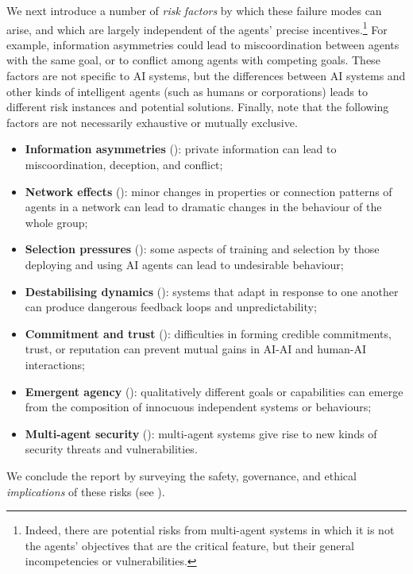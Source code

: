 We next introduce a number of \emph{risk factors} by which these failure modes can arise, and which are largely independent of the agents' precise incentives.\footnote{Indeed, there are potential risks from multi-agent systems in which it is not the agents' objectives that are the critical feature, but their general incompetencies or vulnerabilities.}
For example, information asymmetries could lead to miscoordination between agents with the same goal, or to conflict among agents with competing goals.
These factors are not specific to AI systems, but the differences between AI systems and other kinds of intelligent agents (such as humans or corporations) leads to different risk instances and potential solutions.
Finally, note that the following factors are not necessarily exhaustive or mutually exclusive.
\begin{itemize}
    \item \textbf{Information asymmetries} (): private information can lead to miscoordination, deception, and conflict;
    \item \textbf{Network effects} (): minor changes in properties or connection patterns of agents in a network can lead to dramatic changes in the behaviour of the whole group;
    \item \textbf{Selection pressures} (): some aspects of training and selection by those deploying and using AI agents can lead to undesirable behaviour;
    \item \textbf{Destabilising dynamics} (): systems that adapt in response to one another can produce dangerous feedback loops and unpredictability;
    \item \textbf{Commitment and trust} (): difficulties in forming credible commitments, trust, or reputation can prevent mutual gains in AI-AI and human-AI interactions;
    \item \textbf{Emergent agency} (): qualitatively different goals or capabilities can emerge from the composition of innocuous independent systems or behaviours;
    \item \textbf{Multi-agent security} (): multi-agent systems give rise to new kinds of security threats and vulnerabilities.
\end{itemize}
We conclude the report by surveying the safety, governance, and ethical \emph{implications} of these risks (see ).

